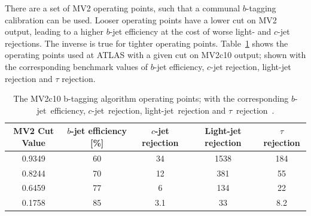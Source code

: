 There are a set of MV2 operating points, such that a communal $b$-tagging calibration can be used.
Looser operating points have a lower cut on MV2 output, leading to a higher $b$-jet efficiency at the cost of worse light- and $c$-jet rejections.
The inverse is true for tighter operating points.
Table~\ref{tab:obj-MV2_WPs} shows the operating points used at ATLAS with a given cut on MV2c10 output;
shown with the corresponding benchmark values of $b$-jet efficiency, $c$-jet rejection, light-jet rejection and $\tau$ rejection.

\begin{table}[!htb]
  \begin{center}
    \begin{tabular}{|c||c|c|c|c|}
      \hline
      MV2 Cut Value  &  $b$-jet efficiency [\%]  &     $c$-jet rejection   &   Light-jet rejection  &    $\tau$ rejection  \\
      \hline
      0.9349         &           60              &           34          &      1538              &     184              \\
      0.8244         &           70              &           12          &       381              &      55              \\
      0.6459         &           77              &           6           &       134              &      22              \\
      0.1758         &           85              &           3.1         &        33              &     8.2              \\
      \hline
    \end{tabular}
    \caption[The MV2c10 b-tagging algorithm operating points; with the corresponding $b$-jet~efficiency, $c$-jet~rejection, light-jet~rejection and $\tau$~rejection.]
            {The MV2c10 b-tagging algorithm operating points; with the corresponding $b$-jet~efficiency, $c$-jet~rejection, light-jet~rejection and $\tau$~rejection~\cite{obj-bjets_algo_2016}.}
            \label{tab:obj-MV2_WPs}
  \end{center}
  \vspace{-1em}
\end{table}

